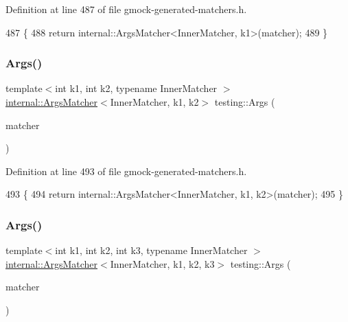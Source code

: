 Definition at line 487 of file gmock-\/generated-\/matchers.\+h.


\begin{DoxyCode}
487                                   \{
488   \textcolor{keywordflow}{return} internal::ArgsMatcher<InnerMatcher, k1>(matcher);
489 \}
\end{DoxyCode}
\mbox{\label{namespacetesting_a663409e441584c81f496e9c98fd3453c}} 
\subsubsection{\texorpdfstring{Args()}{Args()}\hspace{0.1cm}{\footnotesize\ttfamily [3/11]}}
{\footnotesize\ttfamily template$<$int k1, int k2, typename Inner\+Matcher $>$ \\
\hyperlink{classtesting_1_1internal_1_1ArgsMatcher}{internal\+::\+Args\+Matcher}$<$Inner\+Matcher, k1, k2$>$ testing\+::\+Args (\begin{DoxyParamCaption}\item[{const Inner\+Matcher \&}]{matcher }\end{DoxyParamCaption})\hspace{0.3cm}{\ttfamily [inline]}}



Definition at line 493 of file gmock-\/generated-\/matchers.\+h.


\begin{DoxyCode}
493                                   \{
494   \textcolor{keywordflow}{return} internal::ArgsMatcher<InnerMatcher, k1, k2>(matcher);
495 \}
\end{DoxyCode}
\mbox{\label{namespacetesting_abd3ddae153e1c452b7625808cc4d820b}} 
\subsubsection{\texorpdfstring{Args()}{Args()}\hspace{0.1cm}{\footnotesize\ttfamily [4/11]}}
{\footnotesize\ttfamily template$<$int k1, int k2, int k3, typename Inner\+Matcher $>$ \\
\hyperlink{classtesting_1_1internal_1_1ArgsMatcher}{internal\+::\+Args\+Matcher}$<$Inner\+Matcher, k1, k2, k3$>$ testing\+::\+Args (\begin{DoxyParamCaption}\item[{const Inner\+Matcher \&}]{matcher }\end{DoxyParamCaption})\hspace{0.3cm}{\ttfamily [inline]}}




